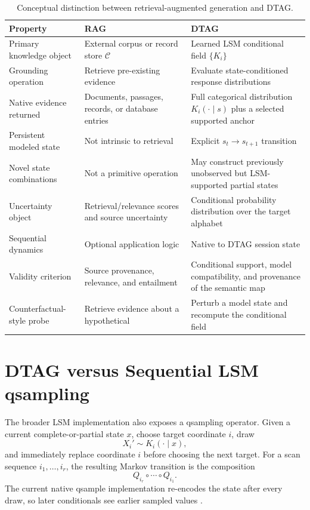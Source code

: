 \documentclass[journal]{IEEEtran}
\newcommand{\1}{\mathbf{1}}
\begin{document}
\begin{table}[t]
\centering
\caption{Conceptual distinction between retrieval-augmented generation and DTAG.}
\label{tab:ragdtag}
\footnotesize
\begin{tabular}{p{} p{} p{}}
\toprule
Property & RAG & DTAG \\
\midrule
Primary knowledge object & External corpus or record store $\mathcal C$ & Learned LSM conditional field $\{K_i\}$ \\
Grounding operation & Retrieve pre-existing evidence & Evaluate state-conditioned response distributions \\
Native evidence returned & Documents, passages, records, or database entries & Full categorical distribution $K_i(\cdot\mid s)$ plus a selected supported anchor \\
Persistent modeled state & Not intrinsic to retrieval & Explicit $s_t\rightarrow s_{t+1}$ transition \\
Novel state combinations & Not a primitive operation & May construct previously unobserved but LSM-supported partial states \\
Uncertainty object & Retrieval/relevance scores and source uncertainty & Conditional probability distribution over the target alphabet \\
Sequential dynamics & Optional application logic & Native to DTAG session state \\
Validity criterion & Source provenance, relevance, and entailment & Conditional support, model compatibility, and provenance of the semantic map \\
Counterfactual-style probe & Retrieve evidence about a hypothetical & Perturb a model state and recompute the conditional field \\
\bottomrule
\end{tabular}
\end{table}

\section{DTAG versus Sequential LSM qsampling}
\label{sec:qsample}

The broader LSM implementation also exposes a qsampling operator. Given a current complete-or-partial state $x$, choose target coordinate $i$, draw
\begin{equation}
  X_i'\sim K_i(\cdot\mid x),
\end{equation}
and immediately replace coordinate $i$ before choosing the next target. For a scan sequence $i_1,\ldots,i_r$, the resulting Markov transition is the composition
\begin{equation}
  Q_{i_r}\circ\cdots\circ Q_{i_1}.
  \label{eq:qsample}
\end{equation}
The current native qsample implementation re-encodes the state after every draw, so later conditionals see earlier sampled values \cite{lsm2026}.
\end{document}

